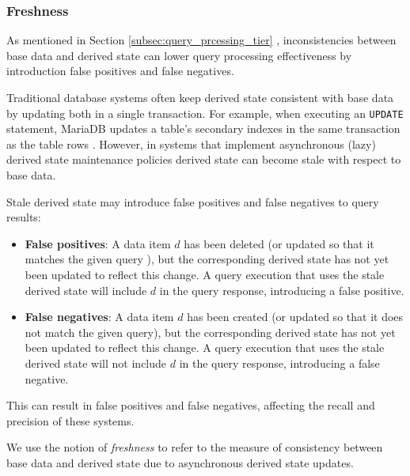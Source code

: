 \subsubsection{Freshness}
\label{sec:models_freshness}
As mentioned in Section \ref{subsec:query_prcessing_tier} , inconsistencies between base data and derived state can lower query
processing effectiveness by introduction false positives and false negatives.

Traditional database systems often keep derived state consistent with base data by updating both in a single transaction.
For example, when executing an \texttt{UPDATE} statement, MariaDB updates a table's secondary indexes in the same transaction
as the table rows \cite{innodb:writepaths}.
However, in systems that implement asynchronous (lazy) derived state maintenance policies \cite{tan:diffindex,
qi:secondaryindexconsistency, shukla:schemaagnostic} derived state can become stale with respect to base data.

Stale derived state may introduce false positives and false negatives to query results:
\begin{itemize}
  \item \textbf{False positives}: A data item $d$ has been deleted (or updated so that it matches the given query ),
  but the corresponding derived state has not yet been updated to reflect this change.
  A query execution that uses the stale derived state will include $d$ in the query response, introducing a false positive.

  \item \textbf{False negatives}: A data item $d$ has been created (or updated so that it does not match the given query),
  but the corresponding derived state has not yet been updated to reflect this change.
  A query execution that uses the stale derived state will not include $d$ in the query response,
  introducing a false negative.
\end{itemize}
This can result in false positives and false negatives, affecting the recall and precision of these systems.

We use the notion of \textit{freshness} to refer to the measure of consistency between base data and derived state due to
asynchronous derived state updates.

